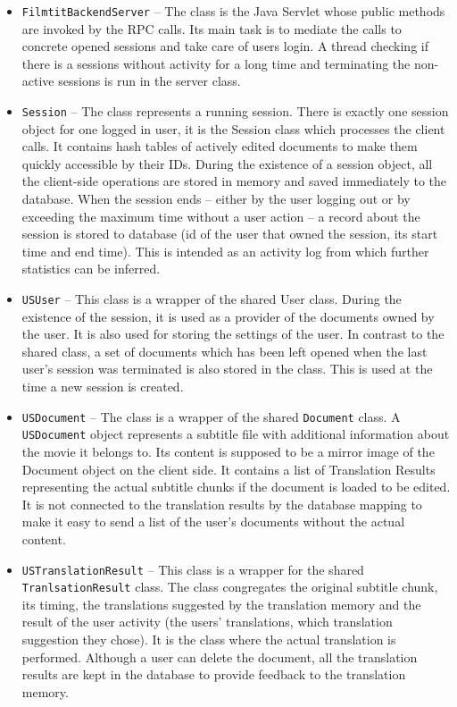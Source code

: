 \begin{itemize}
\item {\tt FilmtitBackendServer}  -- The class is the Java Servlet whose public methods are invoked by the RPC calls. Its main task is to mediate the calls to concrete opened sessions and take care of users login. A thread checking if there is a sessions without activity for a long time and terminating the non-active sessions is run in the server class.

\item {\tt Session} -- The class represents a running session. There is exactly one session object for one logged in user, it is the Session class which processes the client calls. It contains hash tables of actively edited documents to make them quickly accessible by their IDs. During the existence of a session object, all the client-side operations are stored in memory and saved immediately to the database. When the session ends -- either by the user logging out or by exceeding the maximum time without a user action -- a record about the session is stored to database (id of the user that owned the session, its start time and end time). This is intended as an activity log from which further statistics can be inferred.

\item {\tt USUser} -- This class is a wrapper of the shared User class. During the existence of the session, it is used as a provider of the documents owned by the user. It is also used for storing the settings of the user. In contrast to the shared class, a set of documents which has been left opened when the last user's session was terminated is also stored in the class. This is used at the time a new session is created.

\item {\tt USDocument} -- The class is a wrapper of the shared {\tt Document} class. A {\tt USDocument} object represents a subtitle file with additional information about the movie it belongs to. Its content is supposed to be a mirror image of the Document object on the client side. It contains a list of Translation Results representing the actual subtitle chunks if the document is loaded to be edited. It is not connected to the translation results by the database mapping to make it easy to send a list of the user's documents without the actual content.

\item {\tt USTranslationResult} -- This class is a wrapper for the shared {\tt TranlsationResult} class. The class congregates the original subtitle chunk, its timing, the translations suggested by the translation memory and the result of the user activity (the users' translations, which translation suggestion they chose). It is the class where the actual translation is performed. Although a user can delete the document, all the translation results are kept in the database to provide feedback to the translation memory.


\end{itemize}
